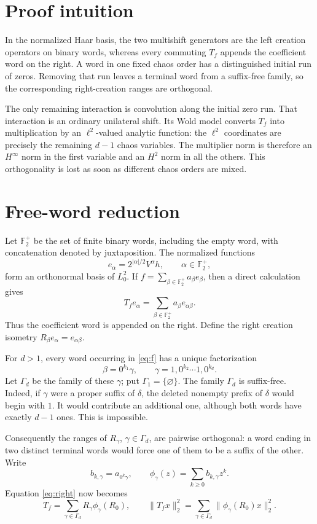 \documentclass[11pt]{article}
\newcommand{\F}{\mathbb F_2^+}
\begin{document}
\section{Proof intuition}

In the normalized Haar basis, the two multishift generators are the left
creation operators on binary words, whereas every commuting $T_f$ appends
the coefficient word on the right.  A word in one fixed chaos order has a
distinguished initial run of zeros.  Removing that run leaves a terminal
word from a suffix-free family, so the corresponding right-creation ranges
are orthogonal.

The only remaining interaction is convolution along the initial zero run.
That interaction is an ordinary unilateral shift.  Its Wold model converts
$T_f$ into multiplication by an $\ell^2$-valued analytic function: the
$\ell^2$ coordinates are precisely the remaining $d-1$ chaos variables.
The multiplier norm is therefore an $H^\infty$ norm in the first variable
and an $H^2$ norm in all the others.  This orthogonality is lost as soon as
different chaos orders are mixed.

\section{Free-word reduction}

Let $\F$ be the set of finite binary words, including the empty word, with
concatenation denoted by juxtaposition.  The normalized functions
\[
 e_\alpha=2^{|\alpha|/2}V^\alpha h,\qquad \alpha\in\F,
\]
form an orthonormal basis of $L_0^2$.  If
$f=\sum_{\beta\in\F}a_\beta e_\beta$, then a direct calculation gives
\begin{equation}\label{eq:right}
 T_fe_\alpha=\sum_{\beta\in\F}a_\beta e_{\alpha\beta}.
\end{equation}
Thus the coefficient word is appended on the right.  Define the right
creation isometry $R_\beta e_\alpha=e_{\alpha\beta}$.

For $d>1$, every word occurring in \eqref{eq:f} has a unique factorization
\[
 \beta=0^{k_1}\gamma,
 \qquad
 \gamma=1,0^{k_2}\cdots1,0^{k_d}.
\]
Let $\Gamma_d$ be the family of these $\gamma$; put
$\Gamma_1=\{\varnothing\}$.  The family $\Gamma_d$ is suffix-free.  Indeed,
if $\gamma$ were a proper suffix of $\delta$, the deleted nonempty prefix
of $\delta$ would begin with $1$.  It would contribute an additional one,
although both words have exactly $d-1$ ones.  This is impossible.

Consequently the ranges of $R_\gamma$, $\gamma\in\Gamma_d$, are pairwise
orthogonal: a word ending in two distinct terminal words would force one
of them to be a suffix of the other.  Write
\[
 b_{k,\gamma}=a_{0^k\gamma},\qquad
 \phi_\gamma(z)=\sum_{k\ge0}b_{k,\gamma}z^k.
\]
Equation \eqref{eq:right} now becomes
\begin{equation}\label{eq:factor}
 T_f=\sum_{\gamma\in\Gamma_d}R_\gamma\phi_\gamma(R_0),
 \qquad
 \|T_fx\|_2^2
 =\sum_{\gamma\in\Gamma_d}\|\phi_\gamma(R_0)x\|_2^2.
\end{equation}
\end{document}
